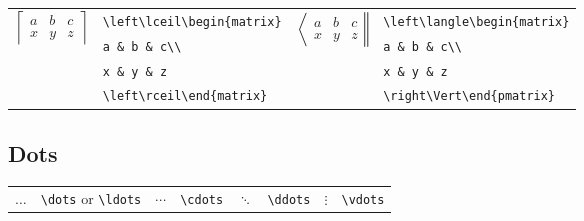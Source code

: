 \documentclass[10pt, english]{article}
\begin{document}
	\begin{center}
		\scriptsize
	\begin{tabular}{ll|ll}
		\multirow{4}{*}{$\left\lceil\begin{matrix}a&b&c\\x&y&z\end{matrix}\right\rceil$} & \verb|\left\lceil\begin{matrix}| & \multirow{4}{*}{$\left\langle\begin{matrix}a&b&c\\x&y&z\end{matrix}\right\Vert$} & \verb|\left\langle\begin{matrix}|\\
		& \verb|a & b & c\\| & & \verb|a & b & c\\|\\ 
		& \verb|x & y & z| & & \verb|x & y & z| \\
		& \verb|\left\rceil\end{matrix}| & & \verb|\right\Vert\end{pmatrix}|\\
	\end{tabular}
	\end{center}

	\subsection{Dots}

	\begin{center}
                \scriptsize
        \begin{tabular}{ll|ll|ll|ll}
                $\dots$ & \verb|\dots| or \verb|\ldots| & $\cdots$ & \verb|\cdots| & $\ddots$ & \verb|\ddots| & $\vdots$ & \verb|\vdots|\\
        \end{tabular}
        \end{center}









\end{document}
